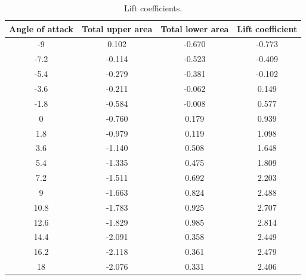 \documentclass[11pt]{article}
\begin{document}
\begin{table}[H]
  \centering
  \label{q2bvals}
    \begin{tabular}{||c|c|c|c||} 
    \hline
    \textbf{Angle of attack} & \textbf{Total upper area} & \textbf{Total lower area} & \textbf{Lift coefficient}\\
    \hline
    \hline
      -9 & 0.102 & -0.670 & -0.773\\
      -7.2 & -0.114 & -0.523 & -0.409\\
      -5.4 & -0.279 & -0.381 & -0.102\\
      -3.6 & -0.211 & -0.062 & 0.149\\
      -1.8 & -0.584 & -0.008 & 0.577\\
      0 & -0.760 & 0.179 & 0.939\\
      1.8 & -0.979 & 0.119 & 1.098\\
      3.6 & -1.140 & 0.508 & 1.648\\
      5.4 & -1.335 & 0.475 & 1.809\\
      7.2 & -1.511 & 0.692 & 2.203\\
      9 & -1.663 & 0.824 & 2.488\\
      10.8 & -1.783 & 0.925 & 2.707\\
      12.6 & -1.829 & 0.985 & 2.814\\
      14.4 & -2.091 & 0.358 & 2.449\\
      16.2 & -2.118 & 0.361 & 2.479\\
      18 & -2.076 & 0.331 & 2.406\\ 
    \hline
   \end{tabular}
   \caption{Lift coefficients.}
\end{table}
\end{document}
